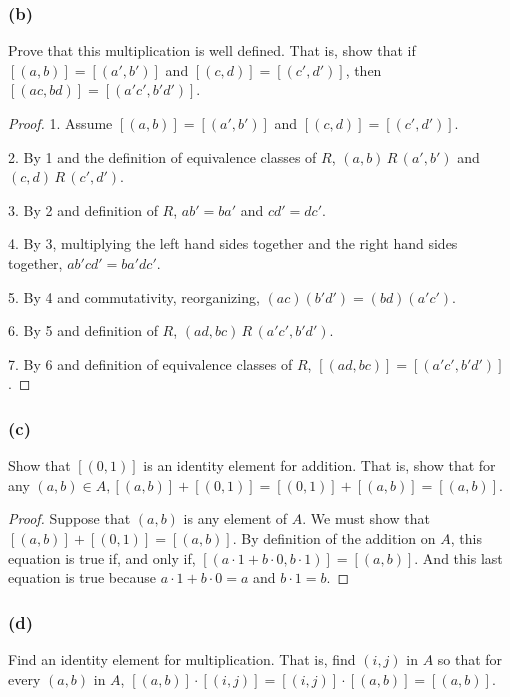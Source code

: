 \documentclass[14pt]{extarticle}
\begin{document}
\subsubsection{(b)}
Prove that this multiplication is well defined. That is, show that if \([(a, b)] = [(a', b')]\) and \([(c, d)] = 
[(c', d')]\), then \([(ac, bd)] = [(a'c', b'd')]\).

\begin{proof}
1. Assume \([(a, b)] = [(a', b')]\) and \([(c, d)] = [(c', d')]\).

2. By 1 and the definition of equivalence classes of $R$, \((a,b) \,R\, (a',b')\) and \((c,d) \,R\, (c',d')\).

3. By 2 and definition of $R$, \(ab' = ba'\) and \(cd' = dc'\).

4. By 3, multiplying the left hand sides together and the right hand sides together, \(ab'cd' = ba'dc'\).

5. By 4 and commutativity, reorganizing, \((ac)(b'd') = (bd)(a'c')\).

6. By 5 and definition of $R$, \((ad, bc) \,R\, (a'c', b'd')\).

7. By 6 and definition of equivalence classes of $R$, \([(ad, bc)] = [(a'c', b'd')]\).
\end{proof}

\subsubsection{(c)}
Show that \([(0, 1)]\) is an identity element for addition. That is, show that for any \((a, b) \in A, [(a, b)] + [(0, 
1)] = [(0, 1)] + [(a, b)] = [(a, b)]\).

\begin{proof}
Suppose that \((a, b)\) is any element of \(A\). We must show that \([(a, b)] + [(0, 1)] = [(a, b)]\). By definition 
of the addition on \(A\), this equation is true if, and only if, \([(a \cdot 1 + b \cdot 0, b \cdot 1)]=[(a, b)]\). 
And this last equation is true because \(a \cdot 1 + b \cdot 0 = a\) and \(b \cdot 1 = b\).
\end{proof}

\subsubsection{(d)}
Find an identity element for multiplication. That is, find \((i, j)\) in \(A\) so that for every \((a, b)\) in \(A\), 
\([(a, b)] \cdot [(i, j)] = [(i, j)] \cdot [(a, b)] = [(a, b)]\).
\end{document}
